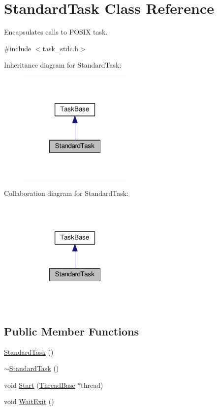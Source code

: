 \hypertarget{classStandardTask}{}\section{Standard\+Task Class Reference}
\label{classStandardTask}


Encapsulates calls to P\+O\+S\+IX task.  




{\ttfamily \#include $<$task\+\_\+stdc.\+h$>$}



Inheritance diagram for Standard\+Task\+:
\nopagebreak
\begin{figure}[H]
\begin{center}
\leavevmode
\includegraphics[width=157pt]{d2/d27/classStandardTask__inherit__graph}
\end{center}
\end{figure}


Collaboration diagram for Standard\+Task\+:
\nopagebreak
\begin{figure}[H]
\begin{center}
\leavevmode
\includegraphics[width=157pt]{d1/dbf/classStandardTask__coll__graph}
\end{center}
\end{figure}
\subsection*{Public Member Functions}
\begin{DoxyCompactItemize}
\item 
\hyperlink{classStandardTask_ad4afb5b0dff5e65fd25a0f01e4152281}{Standard\+Task} ()
\item 
\hyperlink{classStandardTask_a21d94f9838aba597e3b03dfbdf7b4cf5}{$\sim$\+Standard\+Task} ()
\item 
void \hyperlink{classStandardTask_ab454fb19347e79aaaa85151255b630a4}{Start} (\hyperlink{classThreadBase}{Thread\+Base} $\ast$thread)
\item 
void \hyperlink{classStandardTask_a34a72e3871d0322b3078af9a1340b1cf}{Wait\+Exit} ()
\end{DoxyCompactItemize}


